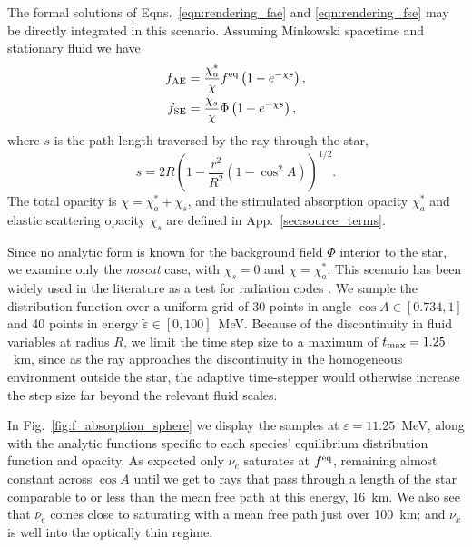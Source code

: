 \documentclass[aps,floatfix,prd,superscriptaddress,twocolumn]{revtex4-1}
\begin{document}
The formal solutions of
Eqns.~\ref{eqn:rendering_fae} and \ref{eqn:rendering_fse}
may be directly integrated in this scenario. Assuming Minkowski spacetime
and stationary fluid we have
\begin{align}
  \label{eqn:fae_homogeneous_general}
  f_{\rm AE} &=
  \frac{\chi_a^{*}}{\chi} f^{\rm eq} \left(1-e^{-\chi s}\right), \\
  \label{eqn:fse_homogeneous_general}
  f_{\rm SE} &=
  \frac{\chi_s}{\chi} \Phi \left(1-e^{-\chi s}\right),
\end{align}
where $s$ is the path length traversed by the ray through the star,
\begin{equation}
  \label{eqn:geometric_s}
  s = 2 R \left(1-\frac{r^2}{R^2}(1-\cos^2 A)\right)^{1/2}.
\end{equation}
The total opacity is $\chi=\chi_a^*+\chi_s$, and the stimulated absorption
opacity $\chi_a^*$ and elastic scattering opacity $\chi_s$
are defined in App.~\ref{sec:source_terms}.

Since no analytic form is known for the background field $\Phi$
interior to the star, we examine only the \emph{noscat} case,
with $\chi_s=0$ and $\chi=\chi_a^{*}$.
This scenario has been widely used in the literature as a test for
radiation codes
\cite{smit1997-two_moment,abdi2012-monte_carlo,fouc2015-m1_nsbh}.
We sample the distribution function over a uniform grid of
30 points in angle $\cos A \in [0.734,1]$ and
40 points in energy $\tilde{\varepsilon} \in [0,100]$~MeV.
Because of the discontinuity in fluid variables at radius $R$,
we limit the time step size to a maximum of $t_{\rm max}=1.25$~km,
since as the ray approaches the discontinuity in the homogeneous environment
outside the star, the adaptive time-stepper would otherwise
increase the step size far beyond the relevant fluid scales.

In Fig.~\ref{fig:f_absorption_sphere} we display the samples at
$\varepsilon=11.25$~MeV, along with the analytic functions
specific to each species' equilibrium distribution function and opacity.
As expected only $\nu_e$ saturates at $f^{\rm eq}$, remaining almost
constant across $\cos A$ until we get to rays that pass through a length
of the star comparable to or less than the mean free path at this energy,
16~km. We also see that $\bar{\nu}_e$ comes close to saturating with
a mean free path just over 100~km; and $\nu_x$ is well into the optically
thin regime.
\end{document}
